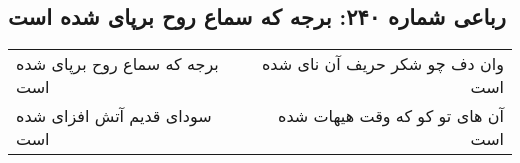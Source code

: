 \begin{center}
\section*{رباعی شماره ۲۴۰: برجه که سماع روح برپای شده است}
\label{sec:0240}
\begin{longtable}{l p{0.5cm} r}
برجه که سماع روح برپای شده است
&&
وان دف چو شکر حریف آن نای شده است
\\
سودای قدیم آتش افزای شده است
&&
آن های تو کو که وقت هیهات شده است
\\
\end{longtable}
\end{center}
